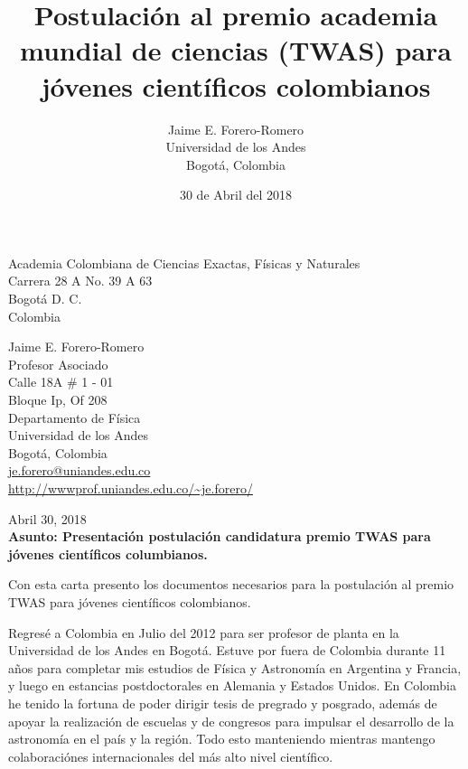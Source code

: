 \documentclass{book}
\title{Postulaci\'on al premio academia mundial de ciencias (TWAS)
  para j\'ovenes cient\'ificos colombianos}
\date{30 de Abril del 2018}
\author{Jaime E. Forero-Romero\\Universidad de los Andes\\Bogot\'a,
  Colombia}
\begin{document}
\maketitle


\begin{flushleft}
Academia Colombiana de Ciencias Exactas, F\'isicas y Naturales\\
Carrera 28 A No. 39 A 63\\
Bogot\'a D. C.\\
Colombia\\
\end{flushleft}
\begin{flushright}
\small
\noindent
  Jaime E. Forero-Romero\\
  Profesor Asociado\\
  Calle 18A \# 1 - 01\\
  Bloque Ip, Of 208\\
  Departamento de F\'isica\\
  Universidad de los Andes\\
  Bogot\'a, Colombia\\
\url{je.forero@uniandes.edu.co}\\
\url{http://wwwprof.uniandes.edu.co/~je.forero/}\\
\end{flushright}

\vspace*{20mm}

\noindent
Abril 30, 2018\\
{\bf Asunto: Presentaci\'on postulaci\'on candidatura premio TWAS para
j\'ovenes cient\'ificos columbianos.}\\

\noindent

Con esta carta presento los documentos necesarios para la
postulaci\'on al premio TWAS para j\'ovenes cient\'ificos colombianos.

Regres\'e a Colombia en Julio del 2012 para ser profesor de planta en
la Universidad de los Andes en Bogot\'a. 
Estuve por fuera de Colombia durante 11 a\~nos para completar mis
estudios de F\'isica y Astronom\'ia en Argentina y Francia, y luego en
estancias postdoctorales en Alemania y Estados Unidos.
En Colombia he tenido la fortuna de poder dirigir tesis de pregrado y
posgrado, adem\'as de apoyar la realizaci\'on de escuelas y de
congresos  para impulsar el desarrollo de la astronom\'ia en el pa\'is y la
regi\'on. Todo esto manteniendo mientras mantengo colaboraci\'ones
internacionales del m\'as alto nivel cient\'ifico. 
\end{document}
